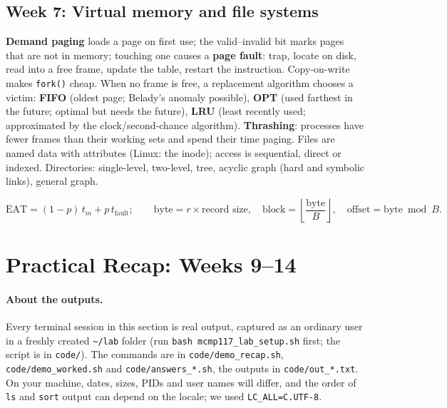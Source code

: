\documentclass[11pt,a4paper]{article}
\newcommand{\term}[1]{\textbf{\color{mintdeep}#1}}
\newcommand{\cmd}[1]{\texttt{#1}}
\begin{document}
\subsection{Week 7: Virtual memory and file systems}
\term{Demand paging} loads a page on first use; the valid--invalid bit marks pages that are not in memory; touching one causes a \term{page fault}: trap, locate on disk, read into a free frame, update the table, restart the instruction. Copy-on-write makes \cmd{fork()} cheap. When no frame is free, a replacement algorithm chooses a victim: \textbf{FIFO} (oldest page; Belady's anomaly possible), \textbf{OPT} (used farthest in the future; optimal but needs the future), \textbf{LRU} (least recently used; approximated by the clock/second-chance algorithm). \term{Thrashing}: processes have fewer frames than their working sets and spend their time paging. Files are named data with attributes (Linux: the inode); access is sequential, direct or indexed. Directories: single-level, two-level, tree, acyclic graph (hard and symbolic links), general graph.
\begin{example}
\[
\text{EAT} = (1-p)\,t_m + p\,t_{\text{fault}}; \qquad
\text{byte} = r \times \text{record size},\quad \text{block} = \left\lfloor \frac{\text{byte}}{B} \right\rfloor,\quad \text{offset} = \text{byte} \bmod B.
\]
\end{example}

\section{Practical Recap: Weeks 9--14}
\label{sec:practical}

\paragraph{About the outputs.} Every terminal session in this section is real output, captured as an ordinary user in a freshly created \texttt{\textasciitilde/lab} folder (run \cmd{bash mcmp117\_lab\_setup.sh} first; the script is in \texttt{code/}). The commands are in \texttt{code/demo\_recap.sh}, \texttt{code/demo\_worked.sh} and \texttt{code/answers\_*.sh}, the outputs in \texttt{code/out\_*.txt}. On your machine, dates, sizes, PIDs and user names will differ, and the order of \cmd{ls} and \cmd{sort} output can depend on the locale; we used \cmd{LC\_ALL=C.UTF-8}.
\end{document}
